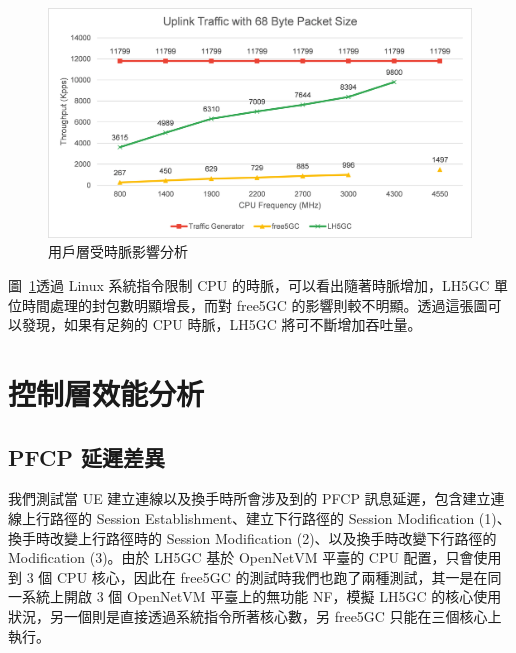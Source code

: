 \begin{figure}[htb]
    \centering
    \includegraphics[height=!,width=0.8\linewidth,keepaspectratio=true]{figures/up_cpu_clock}
    \caption[用戶層受時脈影響分析]{{\footnotesize 用戶層受時脈影響分析}}
    \label{fig:up_cpu_clock}
\end{figure}

圖~\ref{fig:up_cpu_clock}透過 Linux 系統指令限制 CPU 的時脈，可以看出隨著時脈增加，LH5GC 單位時間處理的封包數明顯增長，而對 free5GC 的影響則較不明顯。透過這張圖可以發現，如果有足夠的 CPU 時脈，LH5GC 將可不斷增加吞吐量。

\section{控制層效能分析}
\label{sec:cp_evaluation}

\subsection{PFCP 延遲差異}
\label{subsec:pfcp_comp}

我們測試當 UE 建立連線以及換手時所會涉及到的 PFCP 訊息延遲，包含建立連線上行路徑的 Session Establishment、建立下行路徑的 Session Modification (1)、換手時改變上行路徑時的 Session Modification (2)、以及換手時改變下行路徑的 Modification (3)。由於 LH5GC 基於 OpenNetVM 平臺的 CPU 配置，只會使用到 3 個 CPU 核心，因此在 free5GC 的測試時我們也跑了兩種測試，其一是在同一系統上開啟 3 個 OpenNetVM 平臺上的無功能 NF，模擬 LH5GC 的核心使用狀況，另一個則是直接透過系統指令所著核心數，另 free5GC 只能在三個核心上執行。

